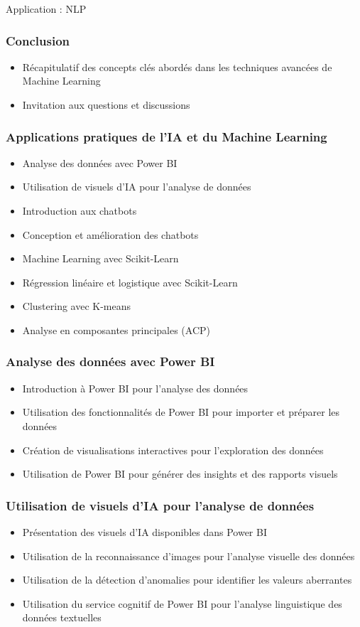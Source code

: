 \documentclass{beamer}
\begin{document}
\begin{frame}{Application : NLP}
	
\end{frame}

\begin{frame}
	\frametitle{Conclusion}
	\begin{itemize}
		\item Récapitulatif des concepts clés abordés dans les techniques avancées de Machine Learning
		\item Invitation aux questions et discussions
	\end{itemize}
\end{frame}

\begin{frame}
	\frametitle{Applications pratiques de l'IA et du Machine Learning}
	\begin{itemize}
		\item Analyse des données avec Power BI
		\item Utilisation de visuels d'IA pour l'analyse de données
		\item Introduction aux chatbots
		\item Conception et amélioration des chatbots
		\item Machine Learning avec Scikit-Learn
		\item Régression linéaire et logistique avec Scikit-Learn
		\item Clustering avec K-means
		\item Analyse en composantes principales (ACP)
	\end{itemize}
\end{frame}

\begin{frame}
	\frametitle{Analyse des données avec Power BI}
	\begin{itemize}
		\item Introduction à Power BI pour l'analyse des données
		\item Utilisation des fonctionnalités de Power BI pour importer et préparer les données
		\item Création de visualisations interactives pour l'exploration des données
		\item Utilisation de Power BI pour générer des insights et des rapports visuels
	\end{itemize}
\end{frame}

\begin{frame}
	\frametitle{Utilisation de visuels d'IA pour l'analyse de données}
	\begin{itemize}
		\item Présentation des visuels d'IA disponibles dans Power BI
		\item Utilisation de la reconnaissance d'images pour l'analyse visuelle des données
		\item Utilisation de la détection d'anomalies pour identifier les valeurs aberrantes
		\item Utilisation du service cognitif de Power BI pour l'analyse linguistique des données textuelles
	\end{itemize}
\end{frame}

\end{document}
